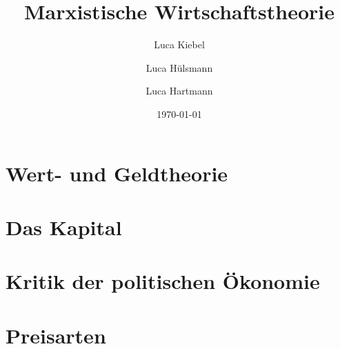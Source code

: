 \documentclass[10pt,a4paper, ngerman]{beamer}
\author{Luca Kiebel \and Luca Hülsmann \and Luca Hartmann}
\title{Marxistische Wirtschaftstheorie}
\date{\today}
\institute[HBBK]{Hans-Böckler-Berufskolleg}
\begin{document}
\begin{frame}
\titlepage
\end{frame}

\section{Wert- und Geldtheorie}

\section{Das Kapital}

\section{Kritik der politischen Ökonomie}

\section{Preisarten}
\end{document}
